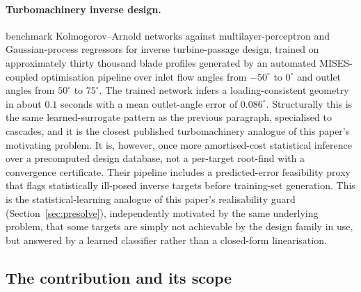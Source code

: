 \paragraph{Turbomachinery inverse design.} \citet{porta2026datadriven}
benchmark Kolmogorov--Arnold networks against multilayer-perceptron and
Gaussian-process regressors for inverse turbine-passage design, trained on
approximately thirty thousand blade profiles generated by an automated
MISES-coupled optimisation pipeline over inlet flow angles from $-50^\circ$
to $0^\circ$ and outlet angles from $50^\circ$ to $75^\circ$. The trained
network infers a loading-consistent geometry in about $0.1$ seconds with a
mean outlet-angle error of $0.086^\circ$. Structurally this is the same
learned-surrogate pattern as the previous paragraph, specialised to cascades,
and it is the closest published turbomachinery analogue of this paper's
motivating problem. It is, however, once more amortised-cost statistical
inference over a precomputed design database, not a per-target root-find with
a convergence certificate. Their pipeline includes a predicted-error
feasibility proxy that flags statistically ill-posed inverse targets before
training-set generation. This is the statistical-learning analogue of this
paper's realisability guard (Section~\ref{sec:presolve}), independently
motivated by the same underlying problem, that some targets are simply not
achievable by the design family in use, but answered by a learned classifier
rather than a closed-form linearisation.

\subsection{The contribution and its scope}
\label{sec:contribution}

